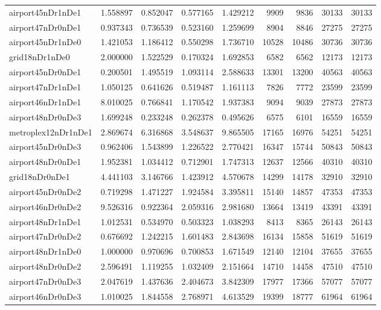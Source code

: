 \begin{longtable}{|l|r|r|r|r|r|r|r|r|}
airport45nDr1nDe1 & 1.558897 & 0.852047 & 0.577165 & 1.429212 & 9909 & 9836 & 30133 & 30133 \\
airport47nDr0nDe1 & 0.937343 & 0.736539 & 0.523160 & 1.259699 & 8904 & 8846 & 27275 & 27275 \\
airport45nDr1nDe0 & 1.421053 & 1.186412 & 0.550298 & 1.736710 & 10528 & 10486 & 30736 & 30736 \\
grid18nDr1nDe0 & 2.000000 & 1.522529 & 0.170324 & 1.692853 & 6582 & 6562 & 12173 & 12173 \\
airport45nDr0nDe1 & 0.200501 & 1.495519 & 1.093114 & 2.588633 & 13301 & 13200 & 40563 & 40563 \\
airport47nDr1nDe1 & 1.050125 & 0.641626 & 0.519487 & 1.161113 & 7826 & 7772 & 23599 & 23599 \\
airport46nDr1nDe1 & 8.010025 & 0.766841 & 1.170542 & 1.937383 & 9094 & 9039 & 27873 & 27873 \\
airport48nDr0nDe3 & 1.699248 & 0.233248 & 0.262378 & 0.495626 & 6575 & 6101 & 16559 & 16559 \\
metroplex12nDr1nDe1 & 2.869674 & 6.316868 & 3.548637 & 9.865505 & 17165 & 16976 & 54251 & 54251 \\
airport45nDr0nDe3 & 0.962406 & 1.543899 & 1.226522 & 2.770421 & 16347 & 15744 & 50843 & 50843 \\
airport48nDr0nDe1 & 1.952381 & 1.034412 & 0.712901 & 1.747313 & 12637 & 12566 & 40310 & 40310 \\
grid18nDr0nDe1 & 4.441103 & 3.146766 & 1.423912 & 4.570678 & 14299 & 14178 & 32910 & 32910 \\
airport45nDr0nDe2 & 0.719298 & 1.471227 & 1.924584 & 3.395811 & 15140 & 14857 & 47353 & 47353 \\
airport46nDr0nDe2 & 9.526316 & 0.922364 & 2.059316 & 2.981680 & 13664 & 13419 & 43391 & 43391 \\
airport48nDr1nDe1 & 1.012531 & 0.534970 & 0.503323 & 1.038293 & 8413 & 8365 & 26143 & 26143 \\
airport47nDr0nDe2 & 0.676692 & 1.242215 & 1.601483 & 2.843698 & 16134 & 15858 & 51619 & 51619 \\
airport48nDr1nDe0 & 1.000000 & 0.970696 & 0.700853 & 1.671549 & 12140 & 12104 & 37655 & 37655 \\
airport48nDr0nDe2 & 2.596491 & 1.119255 & 1.032409 & 2.151664 & 14710 & 14458 & 47510 & 47510 \\
airport47nDr0nDe3 & 2.047619 & 1.437636 & 2.404673 & 3.842309 & 17977 & 17366 & 57077 & 57077 \\
airport46nDr0nDe3 & 1.010025 & 1.844558 & 2.768971 & 4.613529 & 19399 & 18777 & 61964 & 61964 \\

\end{longtable}
